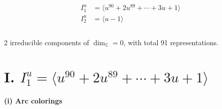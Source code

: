 \documentclass[1p]{elsarticle_modified}
\theoremstyle{definition}
\begin{document}
\begin{align*}
I^u_{1}&=\langle 
u^{90}+2 u^{89}+\cdots+3 u+1\rangle \\
I^u_{2}&=\langle 
u-1\rangle \\
\\
\end{align*}
\raggedright * 2 irreducible components of $\dim_{\mathbb{C}}=0$, with total 91 representations.\\
\newpage
\renewcommand{\arraystretch}{1}
\centering \section*{I. $I^u_{1}= \langle u^{90}+2 u^{89}+\cdots+3 u+1 \rangle$}
\flushleft \textbf{(i) Arc colorings}\\
\end{document}
